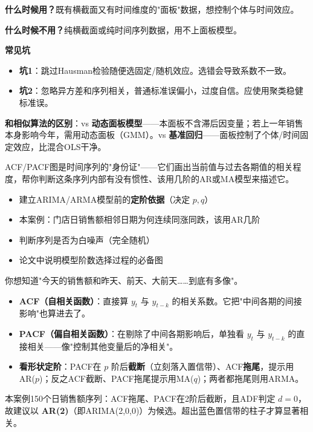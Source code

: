 \begin{algonotes}
\textbf{什么时候用？}既有横截面又有时间维度的"面板"数据，想控制个体与时间效应。

\textbf{什么时候不用？}纯横截面或纯时间序列数据，用不上面板模型。

\textbf{常见坑}
\begin{itemize}
    \item \textbf{坑1}：跳过Hausman检验随便选固定/随机效应。选错会导致系数不一致。
    \item \textbf{坑2}：忽略异方差和序列相关，普通标准误偏小，过度自信。应使用聚类稳健标准误。
\end{itemize}

\textbf{和相似算法的区别}：vs \textbf{动态面板模型}——本面板不含滞后因变量；若上一年销售本身影响今年，需用动态面板（GMM）。vs \textbf{基准回归}——面板控制了个体/时间固定效应，比混合OLS干净。
\end{algonotes}


\begin{algointro}
ACF/PACF图是时间序列的"身份证"——它们画出当前值与过去各期值的相关程度，帮你判断这条序列内部有没有惯性、该用几阶的AR或MA模型来描述它。
\end{algointro}

\begin{algoscene}
\begin{itemize}
    \item 建立ARIMA/ARMA模型前的\textbf{定阶依据}（决定 $p,q$）
    \item 本案例：门店日销售额相邻日期为何连续同涨同跌，该用AR几阶
    \item 判断序列是否为白噪声（完全随机）
    \item 论文中说明模型阶数选择过程的必备图
\end{itemize}
\end{algoscene}

\begin{algoprinciple}
你想知道"今天的销售额和昨天、前天、大前天……到底有多像"。

\begin{itemize}
    \item \textbf{ACF（自相关函数）}：直接算 $y_t$ 与 $y_{t-k}$ 的相关系数。它把"中间各期的间接影响"也算进去了。
    \item \textbf{PACF（偏自相关函数）}：在剔除了中间各期影响后，单独看 $y_t$ 与 $y_{t-k}$ 的直接相关——像"控制其他变量后的净相关"。
    \item \textbf{看形状定阶}：PACF在 $p$ 阶后\textbf{截断}（立刻落入置信带）、ACF\textbf{拖尾}，提示用AR($p$)；反之ACF截断、PACF拖尾提示用MA($q$)；两者都拖尾则用ARMA。
\end{itemize}

本案例150个日销售额序列：ACF拖尾、PACF在2阶后截断，且ADF判定 $d=0$，故建议以 \textbf{AR(2)}（即ARIMA(2,0,0)）为候选。超出蓝色置信带的柱子才算显著相关。
\end{algoprinciple}

